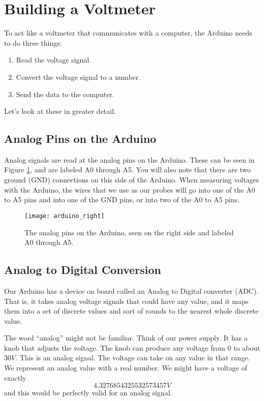\section{Building a Voltmeter}

To act like a voltmeter that communicates with a computer, 
the Arduino needs to do three things:
\begin{enumerate}
\item Read the voltage signal.
\item Convert the voltage signal to a number.
\item Send the data to the computer.
\end{enumerate}

Let's look at these in greater detail.

\subsection{Analog Pins on the Arduino}

Analog signals are read at the analog pins on the Arduino. These can be seen in 
Figure \ref{fig:arduino_right}, and are labeled A0 through A5. You will also
note that there are two ground (GND) connections on this side of the Arduino.
When measuring voltages with the Arduino, the wires that we use as our probes 
will go into one of the A0 to A5 pins and into one of the GND pins, or into 
two of the A0 to A5 pins.
\begin{figure}[htbp!]
\centering
\texttt{[image: arduino\_right]}
\caption[The analog pins on the Arduino]{The analog pins on the Arduino,
seen on the right side and labeled A0 through A5.}
\label{fig:arduino_right}
\end{figure}

\subsection{Analog to Digital Conversion}

Our Arduino has a device on board called an Analog to Digital converter (ADC). 
That is,
it takes analog voltage signals that could have any value, and it maps them
into a set of discrete values and sort of rounds to the nearest whole
discrete value.

The word ``analog'' might not be familiar.
Think of our power supply. It has a knob that adjusts the voltage. The knob
can produce any voltage from $0$ to about $30\unit{V}$. This is an analog
signal. The voltage can take on any value in that range. We represent an
analog value with a real number. We might have a voltage of exactly 
\begin{equation*}
4.3276854325532573457\unit{V}
\end{equation*}
and this would be perfectly valid for an analog signal.


